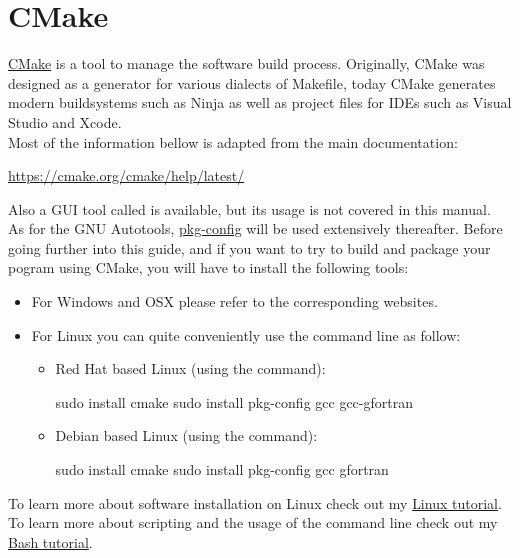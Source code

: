 \section{CMake}

\href{https://cmake.org}{CMake} is a tool to manage the software build process. 
Originally, CMake was designed as a generator for various dialects of Makefile, today CMake generates modern buildsystems such as Ninja as well as project files for IDEs such as Visual Studio and Xcode. \\
Most of the information bellow is adapted from the main documentation: 
\begin{center}\href{https://cmake.org/cmake/help/latest/}{https://cmake.org/cmake/help/latest/} \end{center}
Also a GUI tool called  is available, but its usage is not covered in this manual.  \\
As for the GNU Autotools, \href{https://en.wikipedia.org/wiki/Pkg-config}{pkg-config} will be used extensively thereafter.  
Before going further into this guide, and if you want to try to build and package your pogram using CMake, you will have to install the following tools: 
\begin{itemize}
\item For Windows and OSX please refer to the corresponding websites.
\item For Linux you can quite conveniently use the command line as follow:
\begin{itemize}
\item Red Hat based Linux (using the  command):
\begin{scriptii}
\fprompt{~} sudo  install cmake
\fprompt{~} sudo  install pkg-config gcc gcc-gfortran
\end{scriptii}
\item Debian based Linux (using the  command):
\begin{scriptii}
\fprompt{~} sudo  install cmake
\fprompt{~} sudo  install pkg-config gcc gfortran
\end{scriptii}
\end{itemize}
\end{itemize}
To learn more about software installation on Linux check out my \href{https://www.ipcms.fr/wp-content/uploads/2021/11/linux.pdf}{Linux tutorial}. \\
To learn more about scripting and the usage of the command line check out my \href{https://www.ipcms.fr/wp-content/uploads/2021/05/bash.pdf}{Bash tutorial}.

